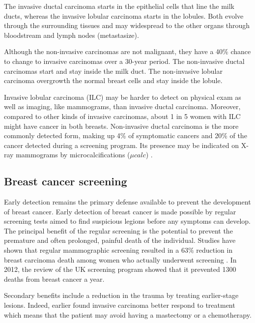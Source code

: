 The invasive ductal carcinoma starts in the epithelial cells that line the milk ducts, whereas the invasive lobular carcinoma starts in the lobules. Both evolve through the surrounding tissues and may widespread to the other organs through bloodstream and lymph nodes (metastasize). 

Although the non-invasive carcinomas are not malignant, they have a 40\% chance to change to invasive carcinomas over a 30-year period. The non-invasive ductal carcinomas start and stay inside the milk duct. The non-invasive lobular carcinoma overgrowth the normal breast cells and stay inside the lobule. 

Invasive lobular carcinoma (ILC)  may be harder to detect on physical exam as well as imaging, like mammograms, than invasive ductal carcinoma. Moreover, compared to other kinds of invasive carcinomas, about 1 in 5 women with ILC might have cancer in both breasts.  Non-invasive ductal carcinoma is the more commonly detected form, making up 4\% of symptomatic cancers and 20\% of the cancer detected during a screening program. Its presence may be indicated on X-ray mammograms by microcalcifications ($\mu calc$) \citep{acs_cancer_2017}.
 
\subsection{Breast cancer screening}\label{subsection:cancerscrenning}
Early detection remains the primary defense available to prevent the development of breast cancer. Early detection of breast cancer is made possible by  regular screening tests aimed to find suspicious legions before any symptoms can develop.  The principal benefit of the regular screening is the potential to prevent the premature and often prolonged, painful death of the individual. Studies have shown that regular mammographic screening resulted in a $63\%$ reduction in breast carcinoma death among women who actually underwent screening \citep{tabar_beyond_2001}. In 2012, the review of the UK screening program \citep{NHSBSP_2012} showed that it prevented 1300 deaths from breast cancer a year. 

Secondary benefits include a reduction in the trauma by treating earlier-stage lesions. Indeed, earlier found invasive carcinoma better respond  to treatment which means that the patient may avoid having a mastectomy or a chemotherapy.

